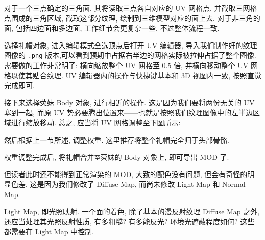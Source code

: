             \par 对于一个三点确定的三角面, 其将读取三点各自对应的 UV 网格点, 并截取三网格点围成的三角区域, 截取这部分纹理, 绘制到三维模型对应的面上去. 对于非三角的面, 包括四边面和多边面, 工作细节会更复杂一些, 不过整体流程一致.
            \par 选择礼帽对象, 进入编辑模式全选顶点后打开 UV 编辑器, 导入我们制作好的纹理图像的 \texttt{.png} 版本,可以看到预期中占据右半边的网格实际被拉伸占据了整个图像. 需要做的工作非常明了: 横向缩放整个 UV 网格至 0.5 倍, 并横向移动整个 UV 网格以使其贴合纹理. UV 编辑器内的操作与快捷键基本和 3D 视图内一致, 按照直觉完成即可.
            \par 接下来选择荧妹 Body 对象, 进行相近的操作. 这是因为我们要将两份无关的 UV 塞到一起, 而原 UV 势必要腾出位置来——也就是按照我们纹理图像中的左半边区域进行缩放移动. 总之, 应当将 UV 网格调整至下图所示:
            \begin{figure}[H]
                \centering
            \end{figure}
            然后根据上一节所述, 调整权重. 这里推荐将整个礼帽完全归于头部骨骼.
            \par 权重调整完成后, 将礼帽合并\texttt{至}荧妹的 Body 对象上, 即可导出 MOD 了.
            \par 但读者此时还不能得到正常渲染的 MOD, 大致的配色没有问题, 但会有奇怪的明显色差, 这是因为我们修改了 Diffuse Map, 而尚未修改 Light Map 和 Normal Map.
            \par Light Map, 即光照映射. 一个面的着色, 除了基本的漫反射纹理 Diffuse Map 之外, 还应当处理其光照反射性质, 有多粗糙? 有多能反光? 环境光遮蔽程度如何? 这些都需要在 Light Map 中控制.
\iffalse
